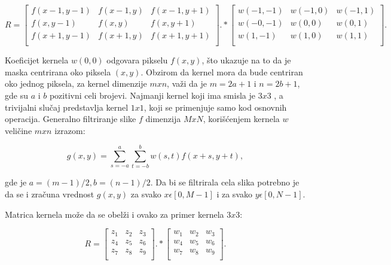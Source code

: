 \documentclass[a4paper,12pt,titlepage]{article}
\begin{document}
\begin{equation}\label{eq:conv2}
R
=
\begin{bmatrix}
     f(x - 1, y - 1) & f(x - 1, y) & f(x - 1, y + 1) \\
     f(x, y - 1) & f(x , y) & f(x, y + 1) \\
     f(x + 1, y - 1) & f(x + 1, y) & f(x + 1, y + 1) \\
\end{bmatrix}
.*
\begin{bmatrix}
     w(- 1, - 1) & w(- 1, 0) & w(- 1, 1) \\
     w(-0, - 1) & w(0, 0) & w(0, 1) \\
     w(1, - 1) & w(1, 0) & w(1, 1) \\
\end{bmatrix}
.\end{equation}

Koeficijet kernela $w(0, 0)$ odgovara pikselu $f(x, y)$, što ukazuje na to da je maska centrirana oko piksela $(x, y)$. Obzirom da kernel mora da bude centriran oko jednog piksela, za kernel dimenzije $m x n$, važi da je $m = 2a + 1$ i $n = 2b + 1$, gde su $a$ i $b$ pozitivni celi brojevi. Najmanji kernel koji ima smisla je $3 x 3$ , a trivijalni slučaj predstavlja kernel $1 x 1$, koji se primenjuje samo kod osnovnih operacija. Generalno filtriranje slike $f$ dimenzija $M x N$, korišćenjem kernela $w$ veličine $m x n$ izrazom:

\begin{equation}\label{eq:conv3}
g(x, y)  = \sum_{s = -a}^{a} \sum_{t = -b}^{b} w(s, t) f(x + s, y + t),
\end{equation}

gde je $a = (m - 1) / 2, b = (n - 1) / 2$. Da bi se filtrirala cela slika potrebno je da se i zračuna vrednost $g(x, y)$ za svako $x \epsilon [0, M - 1]$ i za svako $y \epsilon [0, N - 1]$. 

Matrica kernela može da se obelži i ovako za primer kernela $3 x 3$:

\begin{equation}\label{eq:conv4}
R
=
\begin{bmatrix}
     z_{1} & z_{2} & z_{3} \\
     z_{4} & z_{5} & z_{6} \\
     z_{7} & z_{8} & z_{9} \\
\end{bmatrix}
.*
\begin{bmatrix}
     w_{1} & w_{2} & w_{3} \\
     w_{4} & w_{5} & w_{6} \\
     w_{7} & w_{8} & w_{9} \\
\end{bmatrix}
.\end{equation}
\end{document}
